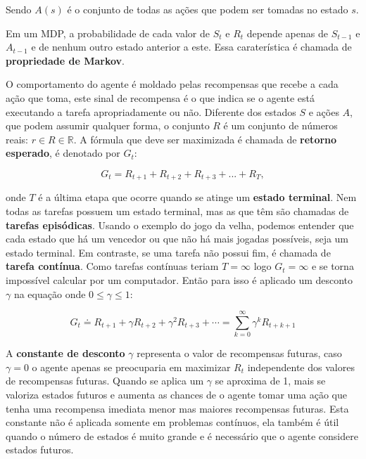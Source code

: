 Sendo $A(s)$ é o conjunto de todas as ações que podem ser tomadas no estado $s$.

Em um MDP, a probabilidade de cada valor de $S_t$ e $R_t$ depende apenas de $S_{t-1}$ e $A_{t-1}$ e de nenhum outro estado anterior a este. Essa caraterística  é chamada de \textbf{propriedade de Markov}. 

O comportamento do agente é moldado pelas recompensas que recebe a cada ação que toma, este sinal de recompensa é o que indica se o agente está executando a tarefa apropriadamente ou não. Diferente dos estados $S$ e ações $A$, que podem assumir qualquer forma, o conjunto $R$ é um conjunto de números reais: $r \in R \in \mathbb{R}$. A fórmula que deve ser maximizada é chamada de \textbf{retorno esperado}, é denotado por $G_t$:

\begin{equation} \label{expected-return}
   G_t = R_{t+1} + R_{t+2} + R_{t+3} + ... + R_{T},
\end{equation}

onde $T$ é a última etapa que ocorre quando se atinge um \textbf{estado terminal}. Nem todas as tarefas possuem um estado terminal, mas as que têm são chamadas de \textbf{tarefas episódicas}. Usando o exemplo do jogo da velha, podemos entender que cada estado que há um vencedor ou que não há mais jogadas possíveis, seja um estado terminal. Em contraste, se uma tarefa não possui fim, é chamada de \textbf{tarefa contínua}. Como tarefas contínuas teriam $T = \infty$ logo $G_t = \infty$ e se torna impossível calcular por um computador. Então para isso é aplicado um desconto $\gamma$ na equação onde $0 \leqslant \gamma \leqslant 1$:

\begin{equation}
   G_t \doteq R_{t+1} + \gamma R_{t+2} + \gamma^{2} R_{t+3} + \cdots = \sum_{k = 0}^{\infty}\gamma^{k}R_{t+k+1}
\end{equation}

A \textbf{constante de desconto} $\gamma$ representa o valor de recompensas futuras, caso $\gamma = 0$ o agente apenas se preocuparia em maximizar $R_t$ independente dos valores de recompensas futuras. Quando se aplica um $\gamma$ se aproxima de 1, mais se valoriza estados futuros e aumenta as chances de o agente tomar uma ação que tenha uma recompensa imediata menor mas maiores recompensas futuras. Esta constante não é aplicada somente em problemas contínuos, ela também é útil quando o número de estados é muito grande e é necessário que o agente considere estados futuros.

